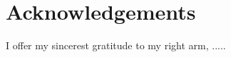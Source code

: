 \thispagestyle{empty}
\section*{Acknowledgements}

I offer my sincerest gratitude to my right arm, .....

\afterpage{\blankpage}
